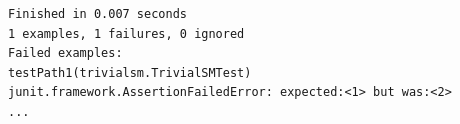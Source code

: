 \begin{description}
\begin{description}
\begin{lstlisting}[label={lst:failedtestsuite}, caption=Failed test suite execution output,breaklines=true]
Finished in 0.007 seconds
1 examples, 1 failures, 0 ignored
Failed examples:
testPath1(trivialsm.TrivialSMTest)
junit.framework.AssertionFailedError: expected:<1> but was:<2>
...
\end{lstlisting}
	
\end{description}
	
\end{description}

